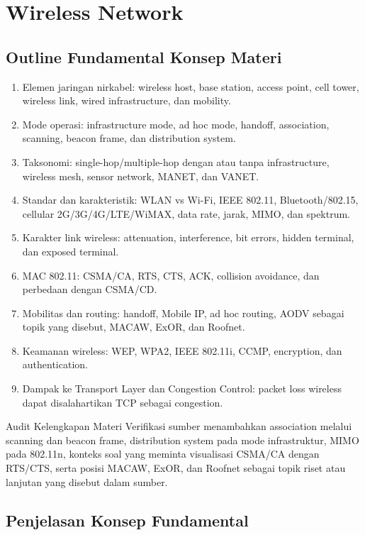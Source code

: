 \section{Wireless Network}

\subsection{Outline Fundamental Konsep Materi}

\begin{enumerate}
    \item Elemen jaringan nirkabel: wireless host, base station, access point, cell tower, wireless link, wired infrastructure, dan mobility.
    \item Mode operasi: infrastructure mode, ad hoc mode, handoff, association, scanning, beacon frame, dan distribution system.
    \item Taksonomi: single-hop/multiple-hop dengan atau tanpa infrastructure, wireless mesh, sensor network, MANET, dan VANET.
    \item Standar dan karakteristik: WLAN vs Wi-Fi, IEEE 802.11, Bluetooth/802.15, cellular 2G/3G/4G/LTE/WiMAX, data rate, jarak, MIMO, dan spektrum.
    \item Karakter link wireless: attenuation, interference, bit errors, hidden terminal, dan exposed terminal.
    \item MAC 802.11: CSMA/CA, RTS, CTS, ACK, collision avoidance, dan perbedaan dengan CSMA/CD.
    \item Mobilitas dan routing: handoff, Mobile IP, ad hoc routing, AODV sebagai topik yang disebut, MACAW, ExOR, dan Roofnet.
    \item Keamanan wireless: WEP, WPA2, IEEE 802.11i, CCMP, encryption, dan authentication.
    \item Dampak ke Transport Layer dan Congestion Control: packet loss wireless dapat disalahartikan TCP sebagai congestion.
\end{enumerate}

\begin{cmt}{Audit Kelengkapan Materi}{}
Verifikasi sumber menambahkan association melalui scanning dan beacon frame, distribution system pada mode infrastruktur, MIMO pada 802.11n, konteks soal yang meminta visualisasi CSMA/CA dengan RTS/CTS, serta posisi MACAW, ExOR, dan Roofnet sebagai topik riset atau lanjutan yang disebut dalam sumber.
\end{cmt}

\subsection{Penjelasan Konsep Fundamental}

